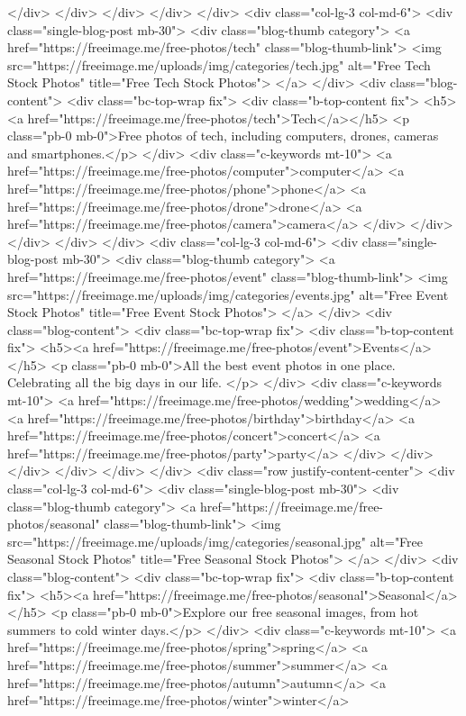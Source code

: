 </div>
</div>
</div>
</div>
</div>
<div class="col-lg-3 col-md-6">
<div class="single-blog-post mb-30">
<div class="blog-thumb category">
<a href="https://freeimage.me/free-photos/tech" class="blog-thumb-link">
<img src="https://freeimage.me/uploads/img/categories/tech.jpg" alt="Free Tech Stock Photos" title="Free Tech Stock Photos">
</a>
</div>
<div class="blog-content">
<div class="bc-top-wrap fix">
<div class="b-top-content fix">
<h5><a href="https://freeimage.me/free-photos/tech">Tech</a></h5>
<p class="pb-0 mb-0">Free photos of tech, including computers, drones, cameras and smartphones.</p>
</div>
<div class="c-keywords mt-10">
<a href="https://freeimage.me/free-photos/computer">computer</a> <a href="https://freeimage.me/free-photos/phone">phone</a> <a href="https://freeimage.me/free-photos/drone">drone</a> <a href="https://freeimage.me/free-photos/camera">camera</a>
</div>
</div>
</div>
</div>
</div>
<div class="col-lg-3 col-md-6">
<div class="single-blog-post mb-30">
<div class="blog-thumb category">
<a href="https://freeimage.me/free-photos/event" class="blog-thumb-link">
<img src="https://freeimage.me/uploads/img/categories/events.jpg" alt="Free Event Stock Photos" title="Free Event Stock Photos">
</a>
</div>
<div class="blog-content">
<div class="bc-top-wrap fix">
<div class="b-top-content fix">
<h5><a href="https://freeimage.me/free-photos/event">Events</a></h5>
<p class="pb-0 mb-0">All the best event photos in one place. Celebrating all the big days in our life. </p>
</div>
<div class="c-keywords mt-10">
<a href="https://freeimage.me/free-photos/wedding">wedding</a> <a href="https://freeimage.me/free-photos/birthday">birthday</a> <a href="https://freeimage.me/free-photos/concert">concert</a> <a href="https://freeimage.me/free-photos/party">party</a>
</div>
</div>
</div>
</div>
</div>
</div>
<div class="row justify-content-center">
<div class="col-lg-3 col-md-6">
<div class="single-blog-post mb-30">
<div class="blog-thumb category">
<a href="https://freeimage.me/free-photos/seasonal" class="blog-thumb-link">
<img src="https://freeimage.me/uploads/img/categories/seasonal.jpg" alt="Free Seasonal Stock Photos" title="Free Seasonal Stock Photos">
</a>
</div>
<div class="blog-content">
<div class="bc-top-wrap fix">
<div class="b-top-content fix">
<h5><a href="https://freeimage.me/free-photos/seasonal">Seasonal</a></h5>
<p class="pb-0 mb-0">Explore our free seasonal images, from hot summers to cold winter days.</p>
</div>
<div class="c-keywords mt-10">
<a href="https://freeimage.me/free-photos/spring">spring</a> <a href="https://freeimage.me/free-photos/summer">summer</a> <a href="https://freeimage.me/free-photos/autumn">autumn</a> <a href="https://freeimage.me/free-photos/winter">winter</a>
